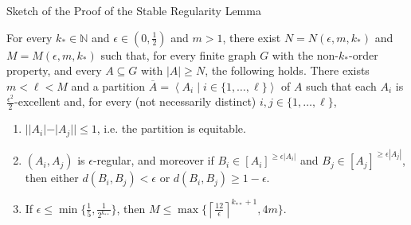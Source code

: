 \documentclass{beamer}
\newcommand{\parcurly}[1]{\{ #1 \}}
\newcommand{\parround}[1]{( #1 )}
\newcommand{\parsquared}[1]{[ #1 ]}
\newcommand{\parstraight}[1]{| #1 |}
\newcommand{\Partriangle}[1]{\left< #1 \right>}
\newcommand{\ceil}[1]{\left\lceil #1 \right\rceil}
\newcommand{\naturals}{\mathbb{N}}
\begin{document}
\begin{frame}{Sketch of the Proof of the Stable Regularity Lemma}
    \begin{theorem}
        For every $k_* \in \naturals$ and
        $\epsilon \in \parround{0, \frac{1}{2}}$ and $m > 1$, there exist $N = N\parround{\epsilon, m, k_*}$
        and $M = M\parround{\epsilon, m, k_*}$ such that, for every finite graph $G$ with the non-$k_{*}$-order property,
        and every $A \subseteq G$ with $|A| \geq N$, the following holds.
        There exists $m < \ell < M$ and a partition
        $\overline{A} = \Partriangle{A_i \mid i \in \parcurly{1, \dots, \ell}}$ of $A$ such that each $A_i$ is
        $\frac{\epsilon^2}{2}$-excellent and, for every (not necessarily distinct) $i, j \in \parcurly{1, \dots, \ell}$,
        \begin{enumerate}
            \item $\parstraight{\parstraight{A_i}- \parstraight{A_j}} \leq 1$, i.e. the partition is equitable.
            \item $\parround{A_i, A_j}$ is $\epsilon$-regular, and moreover if
                $B_i \in \parsquared{A_i}^{\geq \epsilon \parstraight{A_i}}$ and $B_j \in \parsquared{A_j}^{\geq \epsilon \parstraight{A_j}}$,
                then either $d\parround{B_i, B_j} < \epsilon$ or $d\parround{B_i, B_j} \geq 1 - \epsilon$.
            \item If $\epsilon \leq \min \parcurly{\frac{1}{5}, \frac{1}{2^{k_{**}}}}$, then
                $M \leq \max \parcurly{\ceil{\frac{12}{\epsilon}}^{k_{**}+1}, 4m}$.
        \end{enumerate}
    \end{theorem}
\end{frame}

\end{document}
